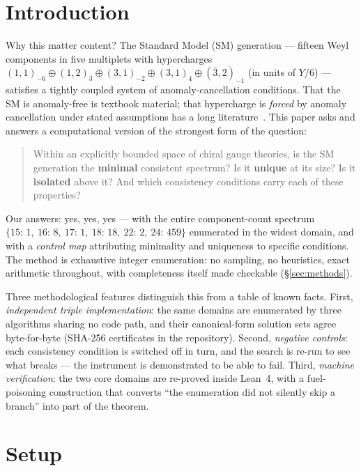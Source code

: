 \documentclass[aps,prd,preprint,nofootinbib]{revtex4-2}
\begin{document}
\section{Introduction}

Why this matter content? The Standard Model (SM) generation --- fifteen Weyl
components in five multiplets with hypercharges
$(1,1)_{-6}\oplus(1,2)_{3}\oplus(3,1)_{-2}\oplus(3,1)_{4}\oplus(\bar 3,2)_{-1}$
(in units of $Y/6$) --- satisfies a tightly coupled system of
anomaly-cancellation conditions. That the SM is anomaly-free is textbook
material; that hypercharge is \emph{forced} by anomaly cancellation under stated
assumptions has a long literature~\cite{GengMarshak,BabuMohapatra,Foot}. This
paper asks and answers a computational version of the strongest form of the
question:

\begin{quote}
Within an explicitly bounded space of chiral gauge theories, is the SM
generation the \textbf{minimal} consistent spectrum? Is it \textbf{unique} at
its size? Is it \textbf{isolated} above it? And which consistency conditions
carry each of these properties?
\end{quote}

Our answers: yes, yes, yes --- with the entire component-count spectrum
$\{15{:}\,1,\ 16{:}\,8,\ 17{:}\,1,\ 18{:}\,18,\ 22{:}\,2,\ 24{:}\,459\}$
enumerated in the widest domain, and with a \emph{control map} attributing
minimality and uniqueness to specific conditions. The method is exhaustive
integer enumeration: no sampling, no heuristics, exact arithmetic throughout,
with completeness itself made checkable (\S\ref{sec:methods}).

Three methodological features distinguish this from a table of known facts.
First, \emph{independent triple implementation}: the same domains are
enumerated by three algorithms sharing no code path, and their canonical-form
solution sets agree byte-for-byte (SHA-256 certificates in the repository).
Second, \emph{negative controls}: each consistency condition is switched off in
turn, and the search is re-run to see what breaks --- the instrument is
demonstrated to be able to fail. Third, \emph{machine verification}: the two
core domains are re-proved inside Lean~4, with a fuel-poisoning construction
that converts ``the enumeration did not silently skip a branch'' into part of
the theorem.

\section{Setup}
\end{document}
